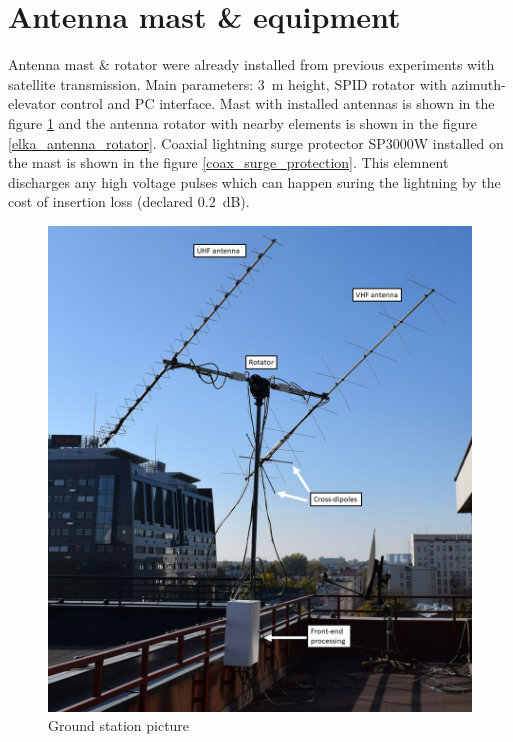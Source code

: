 \section{Antenna mast \& equipment}
Antenna mast \& rotator were already installed from previous experiments with satellite transmission. Main parameters: \SI{3}{\meter} height, SPID rotator with azimuth-elevator control and PC interface. Mast with installed antennas is shown in the figure \ref{elka_antena_mast} and the antenna rotator with nearby elements is shown in the figure \ref{elka_antenna_rotator}. Coaxial lightning surge protector SP3000W installed on the mast is shown in the figure \ref{coax_surge_protection}. This elemnent discharges any high voltage pulses which can happen suring the lightning by the cost of insertion loss (declared \SI{0.2}{\dB}).

\begin{figure}[H]
    \centering
    \includegraphics[width=0.5\paperwidth]{img/7/elka_antena_mast.jpg}
    \caption{Ground station picture}
    \label{elka_antena_mast}
\end{figure}

